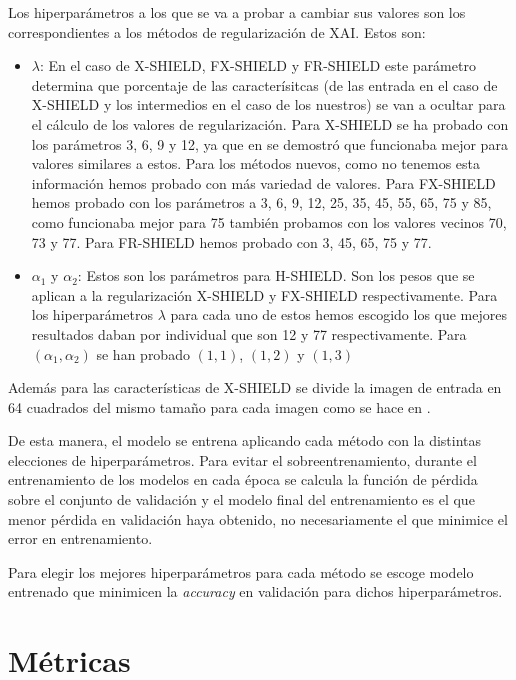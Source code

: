 Los hiperparámetros a los que se va a probar a cambiar sus valores son los correspondientes a los métodos de regularización de XAI. Estos son:

\begin{itemize}

\item $\lambda$: En el caso de X-SHIELD, FX-SHIELD y FR-SHIELD este parámetro determina que porcentaje de las caracterísitcas (de las entrada en el caso de X-SHIELD y los intermedios en el caso de los nuestros) se van a ocultar para el cálculo de los valores de regularización. Para X-SHIELD se ha probado con los parámetros 3, 6, 9 y 12, ya que en \cite{XSHIELD} se demostró que funcionaba mejor para valores similares a estos. Para los métodos nuevos, como no tenemos esta información hemos probado con más variedad de valores. Para FX-SHIELD hemos probado con los parámetros a 3, 6, 9, 12, 25, 35, 45, 55, 65, 75 y 85, como funcionaba mejor para 75 también probamos con los valores vecinos 70, 73 y 77. Para FR-SHIELD hemos probado con 3, 45, 65, 75 y 77.

\item $\alpha_1$ y $ \alpha_2$: Estos son los parámetros para H-SHIELD. Son los pesos que se aplican a la regularización X-SHIELD y FX-SHIELD respectivamente. Para los hiperparámetros $\lambda$ para cada uno de estos hemos escogido los que mejores resultados daban por individual que son 12 y 77 respectivamente. Para $(\alpha_1,\alpha_2)$ se han probado $(1,1)$, $(1,2)$ y $(1,3)$
\end{itemize}

Además para las características de X-SHIELD se divide la imagen de entrada en 64 cuadrados del mismo tamaño para cada imagen como se hace en \cite{XSHIELD}.

De esta manera, el modelo se entrena aplicando cada método con la distintas elecciones de hiperparámetros. Para evitar el sobreentrenamiento, durante el entrenamiento de los modelos en cada época se calcula la función de pérdida sobre el conjunto de validación y el modelo final del entrenamiento es el que menor pérdida en validación haya obtenido, no necesariamente el que minimice el error en entrenamiento. 

Para elegir los mejores hiperparámetros para cada método se escoge modelo entrenado que minimicen la \textit{accuracy} en validación para dichos hiperparámetros.


\section{Métricas}

